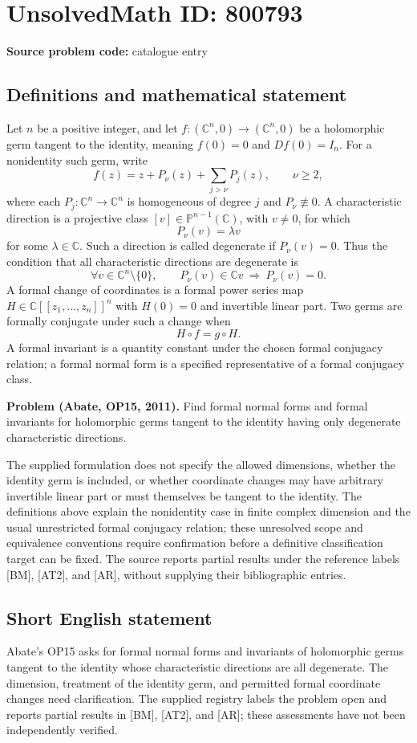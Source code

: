 \documentclass[11pt]{article}
\newcommand{\C}{\mathbb{C}}
\newcommand{\PP}{\mathbb{P}}
\begin{document}
\section*{UnsolvedMath ID: 800793}
\textbf{Source problem code:} catalogue entry
\subsection{Definitions and mathematical statement}
Let \(n\) be a positive integer, and let \(f\colon(\C^n,0)\to(\C^n,0)\) be a holomorphic germ tangent to the identity, meaning \(f(0)=0\) and \(Df(0)=I_n\). For a nonidentity such germ, write
\[
f(z)=z+P_{\nu}(z)+\sum_{j>\nu}P_j(z),\qquad \nu\geq2,
\]
where each \(P_j\colon\C^n\to\C^n\) is homogeneous of degree \(j\) and \(P_{\nu}\not\equiv0\). A characteristic direction is a projective class \([v]\in\PP^{n-1}(\C)\), with \(v\neq0\), for which
\[
P_{\nu}(v)=\lambda v
\]
for some \(\lambda\in\C\). Such a direction is called degenerate if \(P_{\nu}(v)=0\). Thus the condition that all characteristic directions are degenerate is
\[
\forall v\in\C^n\setminus\{0\},\qquad
P_{\nu}(v)\in\C v\ \Longrightarrow\ P_{\nu}(v)=0.
\]
A formal change of coordinates is a formal power series map \(H\in\C[[z_1,\ldots,z_n]]^n\) with \(H(0)=0\) and invertible linear part. Two germs are formally conjugate under such a change when
\[
H\circ f=g\circ H.
\]
A formal invariant is a quantity constant under the chosen formal conjugacy relation; a formal normal form is a specified representative of a formal conjugacy class.

\textbf{Problem (Abate, OP15, 2011).} Find formal normal forms and formal invariants for holomorphic germs tangent to the identity having only degenerate characteristic directions.

The supplied formulation does not specify the allowed dimensions, whether the identity germ is included, or whether coordinate changes may have arbitrary invertible linear part or must themselves be tangent to the identity. The definitions above explain the nonidentity case in finite complex dimension and the usual unrestricted formal conjugacy relation; these unresolved scope and equivalence conventions require confirmation before a definitive classification target can be fixed. The source reports partial results under the reference labels [BM], [AT2], and [AR], without supplying their bibliographic entries.
\subsection{Short English statement}
Abate's OP15 asks for formal normal forms and invariants of holomorphic germs tangent to the identity whose characteristic directions are all degenerate. The dimension, treatment of the identity germ, and permitted formal coordinate changes need clarification. The supplied registry labels the problem open and reports partial results in [BM], [AT2], and [AR]; these assessments have not been independently verified.
\end{document}

